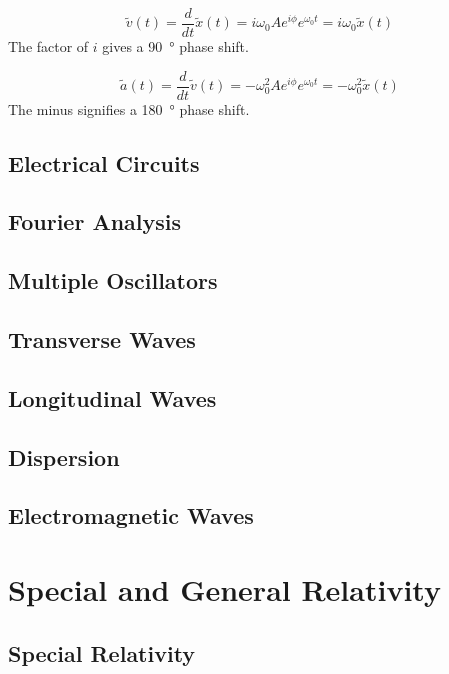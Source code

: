 \documentclass[a4paper, titlepage]{book}
\numberwithin{equation}{section}
\begin{document}
\begin{equation}
    \tilde{v}(t) = \frac{d}{dt} \tilde{x}(t)
    = i\omega_0 A e^{i\phi} e^{\omega_0 t}
    = i\omega_0 \tilde{x}(t)
\end{equation}
The factor of \(i\) gives a \qty{90}{\degree} phase shift.

\begin{equation}
    \tilde{a}(t) = \frac{d}{dt} \tilde{v}(t)
    = -\omega_0^2 A e^{i\phi} e^{\omega_0 t}
    = -\omega_0^2 \tilde{x}(t)
\end{equation}
The minus signifies a \qty{180}{\degree} phase shift.

\chapter{Electrical Circuits}

\chapter{Fourier Analysis}

\chapter{Multiple Oscillators}

\chapter{Transverse Waves}

\chapter{Longitudinal Waves}

\chapter{Dispersion}

\chapter{Electromagnetic Waves}


\part{Special and General Relativity}

\chapter{Special Relativity}
\end{document}
